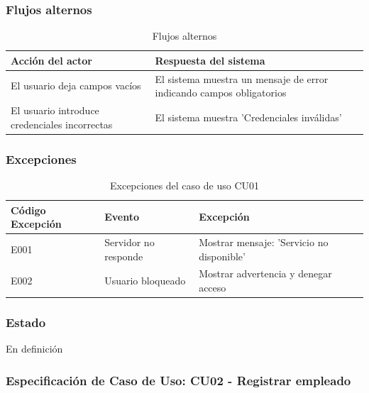 \subsubsection*{Flujos alternos}
\begin{table}[h]
	\centering
	\caption{Flujos alternos}
	\begin{tabular}{|p{7cm}|p{7cm}|}
		\hline
		\textbf{Acción del actor}                     & \textbf{Respuesta del sistema}                                       \\ \hline
		El usuario deja campos vacíos                 & El sistema muestra un mensaje de error indicando campos obligatorios \\ \hline
		El usuario introduce credenciales incorrectas & El sistema muestra 'Credenciales inválidas'                          \\ \hline
	\end{tabular}
\end{table}

\subsubsection*{Excepciones}
\begin{table}[h]
	\centering
	\caption{Excepciones del caso de uso CU01}
	\begin{tabular}{|p{4cm}|p{6cm}|p{6cm}|}
		\hline
		\textbf{Código Excepción} & \textbf{Evento}      & \textbf{Excepción}                        \\ \hline
		E001                      & Servidor no responde & Mostrar mensaje: 'Servicio no disponible' \\ \hline
		E002                      & Usuario bloqueado    & Mostrar advertencia y denegar acceso      \\ \hline
	\end{tabular}
\end{table}

\subsubsection*{Estado}
En definición

\subsubsection*{Especificación de Caso de Uso: CU02 - Registrar empleado}

